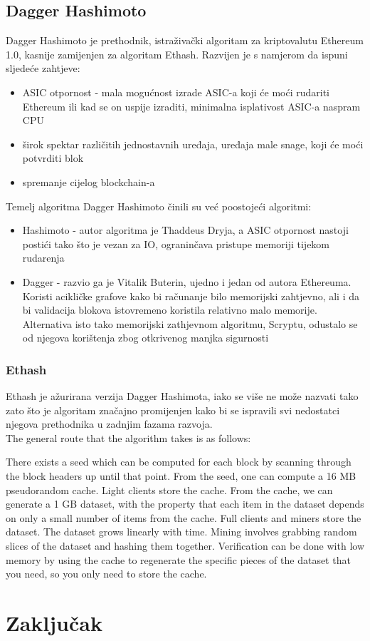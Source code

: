 \documentclass[12pt]{article}
\providecommand\phantomsection{}
\begin{document}
\subsection{Dagger Hashimoto}
Dagger Hashimoto je prethodnik, istraživački algoritam za kriptovalutu Ethereum 1.0, kasnije zamijenjen za algoritam Ethash. Razvijen je s namjerom da ispuni sljedeće zahtjeve:
\begin{itemize}
	\item ASIC otpornost - mala mogućnost izrade ASIC-a koji će moći rudariti Ethereum ili kad se on uspije izraditi, minimalna isplativost ASIC-a naspram CPU
	\item širok spektar različitih jednostavnih uređaja, uređaja male snage, koji će moći potvrditi blok
	\item spremanje cijelog blockchain-a
\end{itemize}
Temelj algoritma Dagger Hashimoto činili su već poostojeći algoritmi:
\begin{itemize}
	\item Hashimoto - autor algoritma je Thaddeus Dryja, a ASIC otpornost nastoji postići tako što je vezan za IO, ograninčava pristupe memoriji tijekom rudarenja 
	\item Dagger - razvio ga je Vitalik Buterin, ujedno i jedan od autora Ethereuma. Koristi acikličke grafove kako bi računanje bilo memorijski zahtjevno, ali i da bi validacija blokova istovremeno koristila relativno malo memorije. Alternativa isto tako memorijski zathjevnom algoritmu, Scryptu, odustalo se od njegova korištenja zbog otkrivenog manjka sigurnosti
\end{itemize}
\cite{dagger-hashimoto}

\subsubsection{Ethash}
Ethash je ažurirana verzija Dagger Hashimota, iako se više ne može nazvati tako zato što je algoritam značajno promijenjen kako bi se ispravili svi nedostatci njegova prethodnika u zadnjim fazama razvoja.\\
The general route that the algorithm takes is as follows:

There exists a seed which can be computed for each block by scanning through the block headers up until that point.
From the seed, one can compute a 16 MB pseudorandom cache. Light clients store the cache.
From the cache, we can generate a 1 GB dataset, with the property that each item in the dataset depends on only a small number of items from the cache. Full clients and miners store the dataset. The dataset grows linearly with time.
Mining involves grabbing random slices of the dataset and hashing them together. Verification can be done with low memory by using the cache to regenerate the specific pieces of the dataset that you need, so you only need to store the cache.
\cite{ethash}

\pagebreak
\section{Zaključak}

\phantomsection
{}

\pagebreak


\phantomsection
{}




	
\end{document}
